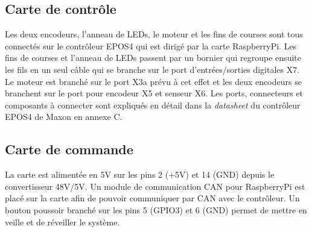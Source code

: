 \subsection{Carte de contrôle}
Les deux encodeurs, l'anneau de LEDs, le moteur et les fins de courses sont tous connectés sur le contrôleur EPOS4 qui est dirigé par la carte
RaspberryPi. Les fins de courses et l'anneau de LEDs passent par un bornier qui regroupe ensuite les fils en un seul câble qui se branche
sur le port d'entrées/sorties digitales X7. Le moteur est branché sur le port X3a prévu à cet effet et les deux encodeurs se branchent sur
le port pour encodeur X5 et senseur X6. Les ports, connecteurs et composants à connecter sont expliqués en détail dans la \textit{datasheet}
du contrôleur EPOS4 de Maxon \cite{Maxon} en annexe C.

\subsection{Carte de commande}

La carte est alimentée en 5V sur les pins 2 (+5V) et 14 (GND) depuis le convertisseur 48V/5V. Un module de communication CAN pour RaspberryPi est
placé sur la carte afin de pouvoir communiquer par CAN avec le contrôleur. Un bouton poussoir branché sur les pins 5 (GPIO3) et 6 (GND) permet de
mettre en veille et de réveiller le système.

